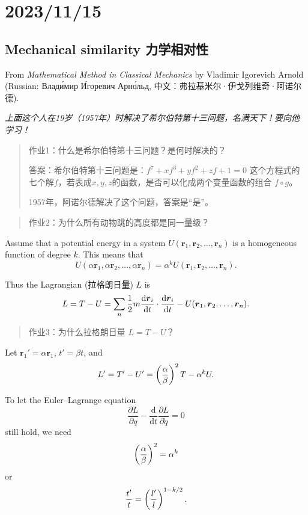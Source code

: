 \chapter{2023/11/15}\label{20231115}

\section{Mechanical similarity
力学相对性}\label{mechanical-similarity-ux529bux5b66ux76f8ux5bf9ux6027}

From \emph{Mathematical Method in Classical Mechanics} by Vladimir
Igorevich Arnold (Russian: Влади́мир И́горевич Арно́льд,
中文：弗拉基米尔·伊戈列维奇·阿诺尔德).

\emph{上面这个人在19岁（1957年）时解决了希尔伯特第十三问题，名满天下！要向他学习！}

\begin{quote}
作业1：什么是希尔伯特第十三问题？是何时解决的？

答案：希尔伯特第十三问题是：\(f^7 + x f^3 +y f^2 + zf + 1 = 0\)
这个方程式的七个解\(f\)，若表成\(x, y, z\)的函数，是否可以化成两个变量函数的组合
\(f \circ g\)。

1957年，阿诺尔德解决了这个问题，答案是``是''。
\end{quote}

\begin{quote}
作业2：为什么所有动物跳的高度都是同一量级？
\end{quote}

Assume that a potential energy in a system
\(U(\boldsymbol{r}_1, \boldsymbol{r}_2, \dots, \boldsymbol{r}_n)\) is a
homogeneous function of degree \(k\). This means that
\[U(\alpha \boldsymbol{r}_1, \alpha \boldsymbol{r}_2, \dots, \alpha \boldsymbol{r}_n) = \alpha^k U(\boldsymbol{r}_1, \boldsymbol{r}_2, \dots, \boldsymbol{r}_n).\]

Thus the Lagrangian (拉格朗日量) \(L\) is
\[L = T - U = \sum_{n} {1 \over 2} m {\mathrm{d} \boldsymbol{r}_i \over \mathrm{d} t} \cdot {\mathrm{d} \boldsymbol{r}_i \over \mathrm{d} t} - U(\boldsymbol{r}_1, \boldsymbol{r}_2, \dots, \boldsymbol{r}_n).\]

\begin{quote}
作业3：为什么拉格朗日量 \(L = T - U\)？
\end{quote}

Let \(\boldsymbol{r}_1' = \alpha \boldsymbol{r}_1\), \(t' = \beta t\),
and
\[L' = T' - U' = \left( {\alpha \over \beta} \right)^2 T - \alpha^k U.\]

To let the Euler--Lagrange equation
\[\frac{\partial L}{\partial q} - \frac{\mathrm{d}}{\mathrm{d}t}\frac{\partial L}{\partial \dot q} = 0\]
still hold, we need \[\left( {\alpha \over \beta} \right)^2 = \alpha^k\]
or \[{t' \over t} = \left( {l' \over l} \right)^{1 - k/2}.\]

